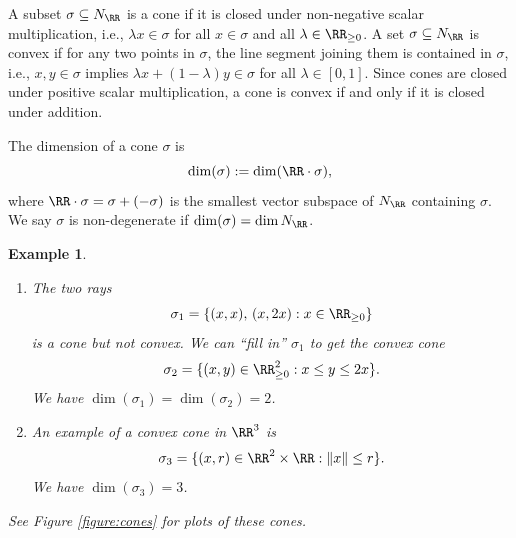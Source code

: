 \documentclass[12pt]{amsart}
\theoremstyle{plain}
\newtheorem{example}[theorem]{Example}
\begin{document}
A subset $\sigma \subseteq N_\RR$ is a cone if it is closed under non-negative scalar multiplication, i.e., $\lambda x \in \sigma$ for all $x \in \sigma$ and all $\lambda \in \RR_{\ge 0}$.
A set $\sigma \subseteq N_\RR$ is convex if for any two points in $\sigma$, the line segment joining them is contained in $\sigma$,
i.e., $x, y \in \sigma$ implies $\lambda x + (1 - \lambda) y \in \sigma$ for all $\lambda \in [0, 1]$.
Since cones are closed under positive scalar multiplication, a cone is convex if and only if it is closed under addition.

The dimension of a cone $\sigma$ is
$$\dim(\sigma) := \dim(\RR \cdot \sigma),$$
where $\RR\cdot\sigma = \sigma + (-\sigma)$ is the smallest vector subspace of $N_\RR$ containing $\sigma$.
We say $\sigma$ is non-degenerate if $\dim(\sigma) = \dim N_\RR$.

\begin{example}\label{example:cones}
\begin{enumerate}
\item
The two rays
$$\sigma_1 = \{(x, x), \, (x, 2x) : x \in \RR_{\ge 0}\}$$
is a cone but not convex.
We can ``fill in'' $\sigma_1$ to get the convex cone
$$\sigma_2 = \{(x, y) \in \RR_{\ge 0}^2 : x \le y \le 2 x\}.$$
We have $\dim (\sigma_1) = \dim(\sigma_2)=2$.

\item
An example of a convex cone in $\RR^3$ is
$$\sigma_3 = \{(x, r) \in \RR^2 \times \RR : \|x\| \le r\}.$$
We have $\dim(\sigma_3)=3$.
\end{enumerate}
\noindent
See Figure \ref{figure:cones} for plots of these cones.
\end{example}
\end{document}
